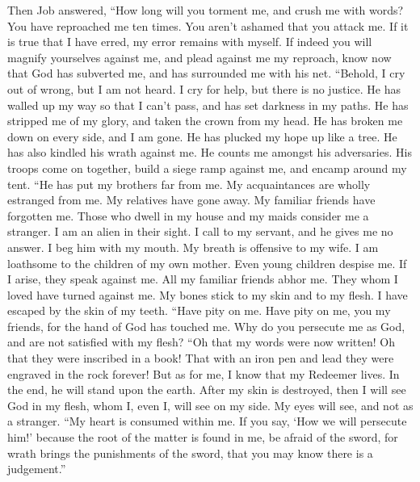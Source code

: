  Then Job answered,  ``How long will you torment
me, and crush me with words?  You have reproached me ten
times. You aren't ashamed that you attack me.  If it is true
that I have erred, my error remains with myself.  If indeed
you will magnify yourselves against me, and plead against me my
reproach,  know now that God has subverted me, and has
surrounded me with his net.  ``Behold, I cry out of wrong,
but I am not heard. I cry for help, but there is no justice.
 He has walled up my way so that I can't pass, and has set
darkness in my paths.  He has stripped me of my glory, and
taken the crown from my head.  He has broken me down on
every side, and I am gone. He has plucked my hope up like a tree.
 He has also kindled his wrath against me. He counts me
amongst his adversaries.  His troops come on together,
build a siege ramp against me, and encamp around my tent. 
``He has put my brothers far from me. My acquaintances are wholly
estranged from me.  My relatives have gone away. My
familiar friends have forgotten me.  Those who dwell in my
house and my maids consider me a stranger. I am an alien in their sight.
 I call to my servant, and he gives me no answer. I beg him
with my mouth.  My breath is offensive to my wife. I am
loathsome to the children of my own mother.  Even young
children despise me. If I arise, they speak against me. 
All my familiar friends abhor me. They whom I loved have turned against
me.  My bones stick to my skin and to my flesh. I have
escaped by the skin of my teeth.  ``Have pity on me. Have
pity on me, you my friends, for the hand of God has touched me.
 Why do you persecute me as God, and are not satisfied with
my flesh?  ``Oh that my words were now written! Oh that
they were inscribed in a book!  That with an iron pen and
lead they were engraved in the rock forever!  But as for
me, I know that my Redeemer lives. In the end, he will stand upon the
earth.  After my skin is destroyed, then I will see God in
my flesh,  whom I, even I, will see on my side. My eyes
will see, and not as a stranger. ``My heart is consumed within me.
 If you say, `How we will persecute him!' because the root
of the matter is found in me,  be afraid of the sword, for
wrath brings the punishments of the sword, that you may know there is a
judgement.''

